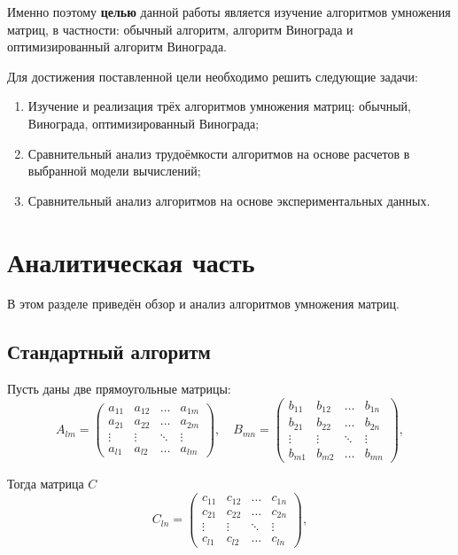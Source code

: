 \documentclass[12pt]{report}
\begin{document}
Именно поэтому \textbf{целью} данной работы является изучение алгоритмов умножения матриц, в частности: обычный алгоритм, алгоритм Винограда и оптимизированный алгоритм Винограда. 

Для достижения поставленной цели необходимо решить следующие задачи:
\begin{enumerate}
	\item Изучение и реализация трёх алгоритмов умножения матриц: обычный, Винограда, оптимизированный Винограда;
	\item Сравнительный анализ трудоёмкости алгоритмов на основе расчетов в выбранной модели вычислений;
	\item Сравнительный анализ алгоритмов на основе экспериментальных данных.
\end{enumerate}


\chapter{Аналитическая часть}

В этом разделе приведён обзор и анализ алгоритмов умножения матриц.

\section{Стандартный алгоритм}

Пусть даны две прямоугольные матрицы:
\begin{equation}
	A_{lm} = \begin{pmatrix}
		a_{11} & a_{12} & \ldots & a_{1m}\\
		a_{21} & a_{22} & \ldots & a_{2m}\\
		\vdots & \vdots & \ddots & \vdots\\
		a_{l1} & a_{l2} & \ldots & a_{lm}
	\end{pmatrix},
	\quad
	B_{mn} = \begin{pmatrix}
		b_{11} & b_{12} & \ldots & b_{1n}\\
		b_{21} & b_{22} & \ldots & b_{2n}\\
		\vdots & \vdots & \ddots & \vdots\\
		b_{m1} & b_{m2} & \ldots & b_{mn}
	\end{pmatrix},
\end{equation}

Тогда матрица $C$
\begin{equation}
	C_{ln} = \begin{pmatrix}
		c_{11} & c_{12} & \ldots & c_{1n}\\
		c_{21} & c_{22} & \ldots & c_{2n}\\
		\vdots & \vdots & \ddots & \vdots\\
		c_{l1} & c_{l2} & \ldots & c_{ln}
	\end{pmatrix},
\end{equation}
\end{document}
